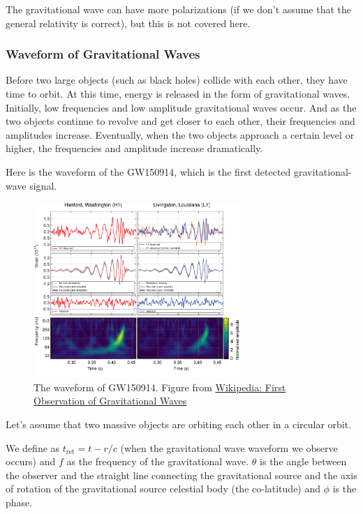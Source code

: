 The gravitational wave can have more polarizations (if we don't assume that the general relativity is correct), but this is not covered here.

\subsubsection{Waveform of Gravitational Waves}

Before two large objects (such as black holes) collide with each other, they have time to orbit. At this time, energy is released in the form of gravitational waves. Initially, low frequencies and low amplitude gravitational waves occur. And as the two objects continue to revolve and get closer to each other, their frequencies and amplitudes increase. Eventually, when the two objects approach a certain level or higher, the frequencies and amplitude increase dramatically.

Here is the waveform of the GW150914, which is the first detected gravitational-wave signal.

\begin{figure}[h]
\centering
\includegraphics[width=0.7\textwidth]{figs/150914.png}
\caption{The waveform of GW150914. Figure from \href{https://en.wikipedia.org/wiki/First_observation_of_gravitational_waves}{Wikipedia: First Observation of Gravitational Waves}}
\end{figure}

Let's assume that two massive objects are orbiting each other in a circular orbit.

We define as $t_{\mathrm{ret}} = t - r/c$ (when the gravitational wave waveform we observe occurs) and $f$ as the frequency of the gravitational wave. $\theta$ is the angle between the observer and the straight line connecting the gravitational source and the axis of rotation of the gravitational source celestial body (the co-latitude) and $\phi$ is the phase.

